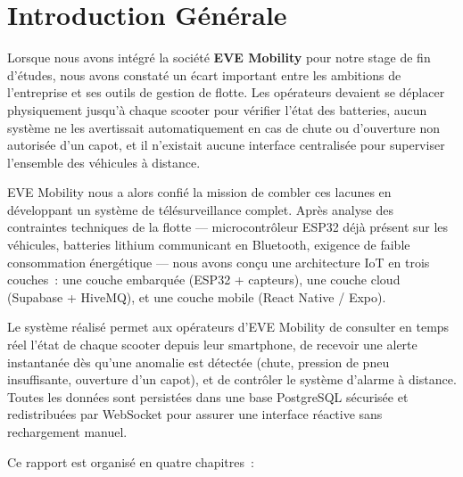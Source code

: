 \documentclass[12pt, a4paper]{report}
\begin{document}
\clearpage
\listoftables
{}
\thispagestyle{fancy}

\clearpage
{}   %

\chapter*{Introduction Générale}
\thispagestyle{fancy}

Lorsque nous avons intégré la société \textbf{EVE Mobility} pour notre stage de fin
d'études, nous avons constaté un écart important entre les ambitions de l'entreprise
et ses outils de gestion de flotte. Les opérateurs devaient se déplacer physiquement
jusqu'à chaque scooter pour vérifier l'état des batteries, aucun système ne les
avertissait automatiquement en cas de chute ou d'ouverture non autorisée d'un capot,
et il n'existait aucune interface centralisée pour superviser l'ensemble des véhicules
à distance.

EVE Mobility nous a alors confié la mission de combler ces lacunes en développant un
système de télésurveillance complet. Après analyse des contraintes techniques de la
flotte --- microcontrôleur ESP32 déjà présent sur les véhicules, batteries lithium
communicant en Bluetooth, exigence de faible consommation énergétique --- nous avons
conçu une architecture IoT en trois couches~: une couche embarquée (ESP32 + capteurs),
une couche cloud (Supabase + HiveMQ), et une couche mobile (React Native / Expo).

Le système réalisé permet aux opérateurs d'EVE Mobility de consulter en temps réel
l'état de chaque scooter depuis leur smartphone, de recevoir une alerte instantanée
dès qu'une anomalie est détectée (chute, pression de pneu insuffisante, ouverture d'un
capot), et de contrôler le système d'alarme à distance. Toutes les données sont
persistées dans une base PostgreSQL sécurisée et redistribuées par WebSocket pour
assurer une interface réactive sans rechargement manuel.

Ce rapport est organisé en quatre chapitres~:
\end{document}

